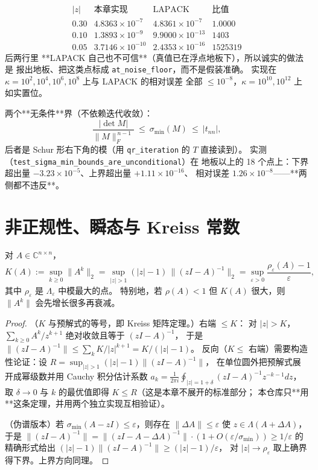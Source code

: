 \[
\begin{array}{c|ccc}
|z| & \text{本章实现} & \text{LAPACK} & \text{比值}\\\hline
0.30 & 4.8363\times10^{-7} & 4.8361\times10^{-7} & 1.0000\\
0.10 & 1.3893\times10^{-9} & 9.9000\times10^{-13} & 1403\\
0.05 & 3.7146\times10^{-10} & 2.4353\times10^{-16} & 1525319
\end{array}
\]
后两行里 **LAPACK 自己也不可信**（真值已在浮点地板下），所以诚实的做法是
报出地板、把这类点标成 \texttt{at\_noise\_floor}，而不是假装准确。
实现在 $\kappa=10^{2},10^{4},10^{6},10^{8}$ 上与 LAPACK 的相对误差
全部 $\le10^{-8}$，$\kappa=10^{10},10^{12}$ 上如实置位。

两个**无条件**界（不依赖迭代收敛）：
\[
  \frac{|\det M|}{\|M\|_F^{\,n-1}}\ \le\ \sigma_{\min}(M)\ \le\ |t_{nn}| ,
\]
后者是 Schur 形右下角的模（用 \texttt{qr\_iteration} 的 $T$ 直接读到）。
实测（\texttt{test\_sigma\_min\_bounds\_are\_unconditional}）在
地板以上的 18 个点上：下界超出量 $-3.23\times10^{-5}$、上界超出量 $+1.11\times10^{-16}$、
相对误差 $1.26\times10^{-8}$——**两侧都不违反**。

\section{非正规性、瞬态与 Kreiss 常数}
\label{sec:transient}

\begin{theorem}
\label{thm:kreiss}
对 $A\in\mathbb{C}^{n\times n}$，
\[
  K(A):=\sup_{k\ge0}\|A^k\|_2
  =\sup_{|z|>1}(|z|-1)\,\|(zI-A)^{-1}\|_2
  =\sup_{\varepsilon>0}\frac{\rho_\varepsilon(A)-1}{\varepsilon},
\]
其中 $\rho_\varepsilon$ 是 $\Lambda_\varepsilon$ 中模最大的点。
特别地，若 $\rho(A)<1$ 但 $K(A)$ 很大，则 $\|A^k\|$ 会先增长很多再衰减。
\end{theorem}

\begin{proof}
（$K$ 与预解式的等号，即 Kreiss 矩阵定理。）右端 $\le K$：
对 $|z|>K$，$\sum_{k\ge0}A^k/z^{k+1}$ 绝对收敛且等于 $(zI-A)^{-1}$，
于是 $\|(zI-A)^{-1}\|\le\sum_kK/|z|^{k+1}=K/(|z|-1)$。
反向（$K\le$ 右端）需要构造性论证：设 $R=\sup_{|z|>1}(|z|-1)\|(zI-A)^{-1}\|$，
在单位圆外把预解式展开成幂级数并用 Cauchy 积分估计系数
$a_k=\frac1{2\pi i}\oint_{|z|=1+\delta}(zI-A)^{-1}z^{-k-1}dz$，
取 $\delta\to0$ 与 $k$ 的最优值即得 $K\le R$（这是本章不展开的标准部分；
本仓库只**用**这条定理，并用两个独立实现互相验证）。

（伪谱版本）若 $\sigma_{\min}(A-zI)\le\varepsilon$，则存在 $\|\Delta A\|\le\varepsilon$
使 $z\in\Lambda(A+\Delta A)$，于是
$\|(zI-A)^{-1}\|=\|(zI-A-\Delta A)^{-1}\|\cdot(1+O(\varepsilon/\sigma_{\min}))
\ge1/\varepsilon$ 的精确形式给出 $(|z|-1)\|(zI-A)^{-1}\|\ge(|z|-1)/\varepsilon$，
对 $|z|\to\rho_\varepsilon$ 取上确界得下界。上界方向同理。
\end{proof}

